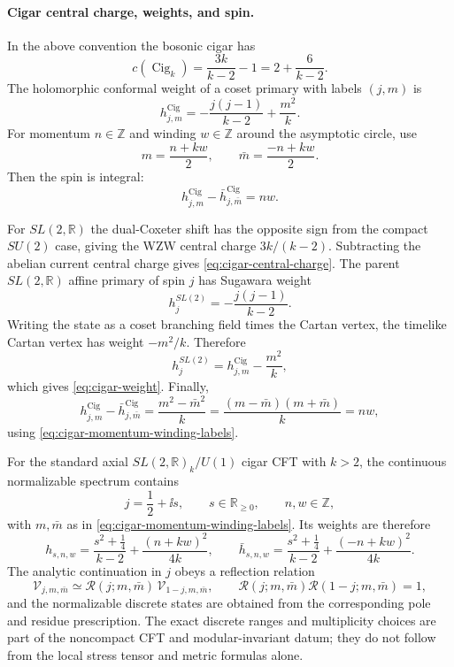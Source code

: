 \paragraph{Cigar central charge, weights, and spin.}
In the above convention the bosonic cigar has
\begin{equation}
  c(\operatorname{Cig}_k)
  =
  \frac{3k}{k-2}-1
  =
  2+\frac{6}{k-2}.
  \label{eq:cigar-central-charge}
\end{equation}
The holomorphic conformal weight of a coset primary with labels \((j,m)\)
is
\begin{equation}
  h^{\operatorname{Cig}}_{j,m}
  =
  -\frac{j(j-1)}{k-2}
  +
  \frac{m^2}{k}.
  \label{eq:cigar-weight}
\end{equation}
For momentum \(n\in\mathbb Z\) and winding \(w\in\mathbb Z\) around the
asymptotic circle, use
\begin{equation}
  m=\frac{n+kw}{2},
  \qquad
  \bar m=\frac{-n+kw}{2}.
  \label{eq:cigar-momentum-winding-labels}
\end{equation}
Then the spin is integral:
\[
  h^{\operatorname{Cig}}_{j,m}-\bar h^{\operatorname{Cig}}_{j,\bar m}=nw.
\]

For \(SL(2,\mathbb R)\) the dual-Coxeter shift has the opposite sign from
the compact \(SU(2)\) case, giving the WZW central charge \(3k/(k-2)\).
Subtracting the abelian current central charge gives
\eqref{eq:cigar-central-charge}.  The parent \(SL(2,\mathbb R)\) affine
primary of spin \(j\) has Sugawara weight
\[
  h^{SL(2)}_{j}
  =
  -\frac{j(j-1)}{k-2}.
\]
Writing the state as a coset branching field times the Cartan vertex, the
timelike Cartan vertex has weight \(-m^2/k\).  Therefore
\[
  h^{SL(2)}_{j}
  =
  h^{\operatorname{Cig}}_{j,m}-\frac{m^2}{k},
\]
which gives \eqref{eq:cigar-weight}.  Finally,
\[
  h^{\operatorname{Cig}}_{j,m}-\bar h^{\operatorname{Cig}}_{j,\bar m}
  =
  \frac{m^2-\bar m^2}{k}
  =
  \frac{(m-\bar m)(m+\bar m)}{k}
  =
  nw,
\]
using \eqref{eq:cigar-momentum-winding-labels}.

\begin{remark}
\label{rem:bosonic-cigar-spectrum-status}
For the standard axial \(SL(2,\mathbb R)_k/U(1)\) cigar CFT with \(k>2\),
the continuous normalizable spectrum contains
\[
  j=\frac12+\ii s,\qquad s\in\mathbb R_{\ge0},
  \qquad
  n,w\in\mathbb Z,
\]
with \(m,\bar m\) as in \eqref{eq:cigar-momentum-winding-labels}.  Its
weights are therefore
\[
  h_{s,n,w}
  =
  \frac{s^2+\frac14}{k-2}
  +
  \frac{(n+kw)^2}{4k},
  \qquad
  \bar h_{s,n,w}
  =
  \frac{s^2+\frac14}{k-2}
  +
  \frac{(-n+kw)^2}{4k}.
\]
The analytic continuation in \(j\) obeys a reflection relation
\[
  \mathcal V_{j,m,\bar m}
  \simeq
  \mathcal R(j;m,\bar m)\,\mathcal V_{1-j,m,\bar m},
  \qquad
  \mathcal R(j;m,\bar m)\mathcal R(1-j;m,\bar m)=1,
\]
and the normalizable discrete states are obtained from the corresponding
pole and residue prescription.  The exact discrete ranges and multiplicity
choices are part of the noncompact CFT and modular-invariant datum; they do
not follow from the local stress tensor and metric formulas alone.
\end{remark}

